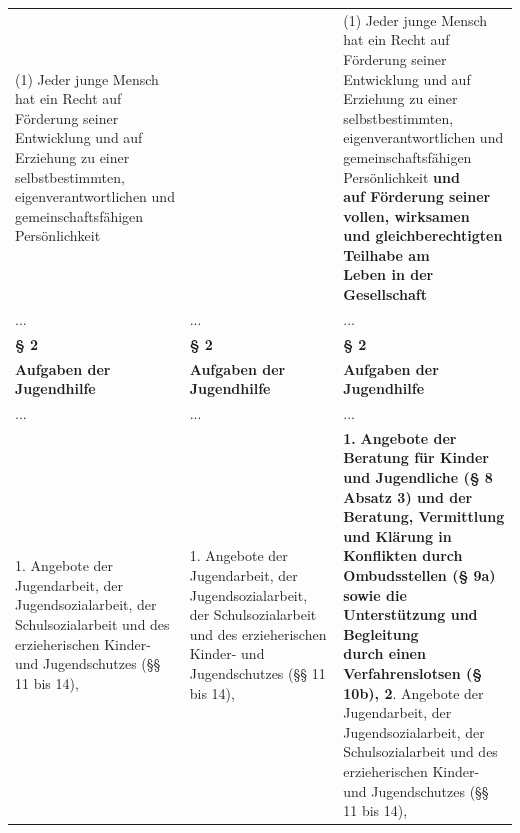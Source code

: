 \documentclass[10pt,a4paper,landscape]{article}
\begin{document}
\begin{longtable}{|L{8.2cm}|L{8.2cm}|L{8.2cm}|}
(1) Jeder junge Mensch hat ein Recht auf  \newline Förderung seiner Entwicklung und auf  \newline Erziehung zu einer selbstbestimmten,  \newline eigenverantwortlichen und  \newline gemeinschaftsfähigen Persönlichkeit &  & (1) Jeder junge Mensch hat ein Recht auf  \newline Förderung seiner Entwicklung und auf  \newline Erziehung zu einer selbstbestimmten,  \newline eigenverantwortlichen und  \newline gemeinschaftsfähigen Persönlichkeit \textbf{\textcolor{diffgreen}{und  \newline auf Förderung seiner vollen, wirksamen  \newline und gleichberechtigten Teilhabe am  \newline Leben in der Gesellschaft}} \\
\hhline{|---|}
... & ... & ... \\
\hhline{|---|}
\textbf{\S{} 2} & \textbf{\S{} 2} & \textbf{\S{} 2} \\
\hhline{|---|}
\textbf{Aufgaben der Jugendhilfe} & \textbf{Aufgaben der Jugendhilfe} & \textbf{Aufgaben der Jugendhilfe} \\
\hhline{|---|}
... & ... & ... \\
\hhline{|---|}
1.  \newline Angebote der Jugendarbeit, der  \newline Jugendsozialarbeit, der Schulsozialarbeit  \newline und des erzieherischen Kinder- und  \newline Jugendschutzes (\S{}\S{} 11 bis 14), & 1.  \newline Angebote der Jugendarbeit, der  \newline Jugendsozialarbeit, der Schulsozialarbeit  \newline und des erzieherischen Kinder- und  \newline Jugendschutzes (\S{}\S{} 11 bis 14), & \textbf{1. }\textbf{\textcolor{diffgreen}{Angebote der Beratung für Kinder  \newline und Jugendliche (\S{} 8 Absatz 3) und der  \newline Beratung, Vermittlung und Klärung in  \newline Konflikten durch Ombudsstellen (\S{} 9a)  \newline sowie die Unterstützung und Begleitung  \newline durch einen Verfahrenslotsen (\S{} 10b), }} \textbf{\textcolor{diffgreen}{2}}\textcolor{diffgreen}{.}  \newline Angebote der Jugendarbeit, der  \newline Jugendsozialarbeit, der Schulsozialarbeit  \newline und des erzieherischen Kinder- und  \newline Jugendschutzes (\S{}\S{} 11 bis 14), \\

\end{longtable}
\end{document}
